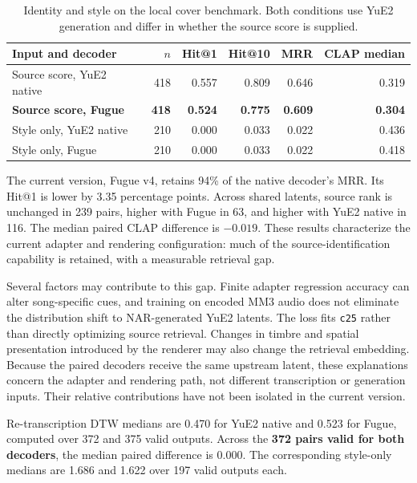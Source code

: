 \documentclass[11pt,a4paper]{article}
\newcommand{\code}[1]{\texttt{#1}}
\begin{document}
\begin{table}[htbp]
    \centering
    \caption{Identity and style on the local cover benchmark. Both conditions use YuE2 generation and differ in whether the source score is supplied.}
    \label{tab:identity}
    \small
    \begin{tabular}{lrrrrr}
        \toprule
        Input and decoder & $n$ & Hit@1 & Hit@10 & MRR & CLAP median \\
        \midrule
        Source score, YuE2 native & 418 & 0.557 & 0.809 & 0.646 & 0.319 \\
        \textbf{Source score, Fugue} & \textbf{418} & \textbf{0.524} & \textbf{0.775} & \textbf{0.609} & \textbf{0.304} \\
        Style only, YuE2 native & 210 & 0.000 & 0.033 & 0.022 & 0.436 \\
        Style only, Fugue & 210 & 0.000 & 0.033 & 0.022 & 0.418 \\
        \bottomrule
    \end{tabular}
\end{table}

The current version, Fugue v4, retains 94\% of the native decoder's MRR. Its Hit@1 is lower by 3.35 percentage points. Across shared latents, source rank is unchanged in 239 pairs, higher with Fugue in 63, and higher with YuE2 native in 116. The median paired CLAP difference is $-0.019$. These results characterize the current adapter and rendering configuration: much of the source-identification capability is retained, with a measurable retrieval gap.

Several factors may contribute to this gap. Finite adapter regression accuracy can alter song-specific cues, and training on encoded MM3 audio does not eliminate the distribution shift to NAR-generated YuE2 latents. The loss fits \code{c25} rather than directly optimizing source retrieval. Changes in timbre and spatial presentation introduced by the renderer may also change the retrieval embedding. Because the paired decoders receive the same upstream latent, these explanations concern the adapter and rendering path, not different transcription or generation inputs. Their relative contributions have not been isolated in the current version.

Re-transcription DTW medians are 0.470 for YuE2 native and 0.523 for Fugue, computed over 372 and 375 valid outputs. Across the \textbf{372 pairs valid for both decoders}, the median paired difference is 0.000. The corresponding style-only medians are 1.686 and 1.622 over 197 valid outputs each.
\end{document}

